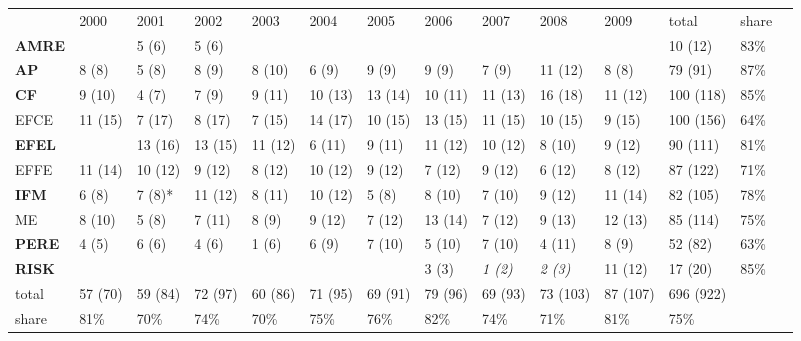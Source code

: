 \begin{tabular}{lllllllllll|lll}
 & 2000 & 2001 & 2002 & 2003 & 2004 & 2005 & 2006 & 2007 & 2008 & 2009 & total & share \\
\textbf{AMRE} &  & 5 (6) & 5 (6) &  &  &  &  &  &  &  & 10 (12) & 83\% \\
\textbf{AP} & 8 (8) & 5 (8) & 8 (9) & 8 (10) & 6 (9) & 9 (9) & 9 (9) & 7 (9) & 11 (12) & 8 (8) & 79 (91) & 87\% \\
\textbf{CF} & 9 (10) & 4 (7) & 7 (9) & 9 (11) & 10 (13) & 13 (14) & 10 (11) & 11 (13) & 16 (18) & 11 (12) & 100 (118) & 85\% \\
EFCE & 11 (15) & 7 (17) & 8 (17) & 7 (15) & 14 (17) & 10 (15) & 13 (15) & 11 (15) & 10 (15) & 9 (15) & 100 (156) & 64\% \\
\textbf{EFEL} &  & 13 (16) & 13 (15) & 11 (12) & 6 (11) & 9 (11) & 11 (12) & 10 (12) & 8 (10) & 9 (12) & 90 (111) & 81\% \\
EFFE & 11 (14) & 10 (12) & 9 (12) & 8 (12) & 10 (12) & 9 (12) & 7 (12) & 9 (12) & 6 (12) & 8 (12) & 87 (122) & 71\% \\
\textbf{IFM} & 6 (8) & 7 (8)* & 11 (12) & 8 (11) & 10 (12) & 5 (8) & 8 (10) & 7 (10) & 9 (12) & 11 (14) & 82 (105) & 78\% \\
ME & 8 (10) & 5 (8) & 7 (11) & 8 (9) & 9 (12) & 7 (12) & 13 (14) & 7 (12) & 9 (13) & 12 (13) & 85 (114) & 75\% \\
\textbf{PERE} & 4 (5) & 6 (6) & 4 (6) & 1 (6) & 6 (9) & 7 (10) & 5 (10) & 7 (10) & 4 (11) & 8 (9) & 52 (82) & 63\% \\
\textbf{RISK} &  &  &  &  &  &  & 3 (3) & \textit{1 (2)} & \textit{2 (3)} & 11 (12) & 17 (20) & 85\% \\
\cmidrule{1-11} total & 57 (70) & 59 (84) & 72 (97) & 60 (86) & 71 (95) & 69 (91) & 79 (96) & 69 (93) & 73 (103) & 87 (107) & 696 (922) &  \\
share & 81\% & 70\% & 74\% & 70\% & 75\% & 76\% & 82\% & 74\% & 71\% & 81\% & 75\% &  \\
\end{tabular}
